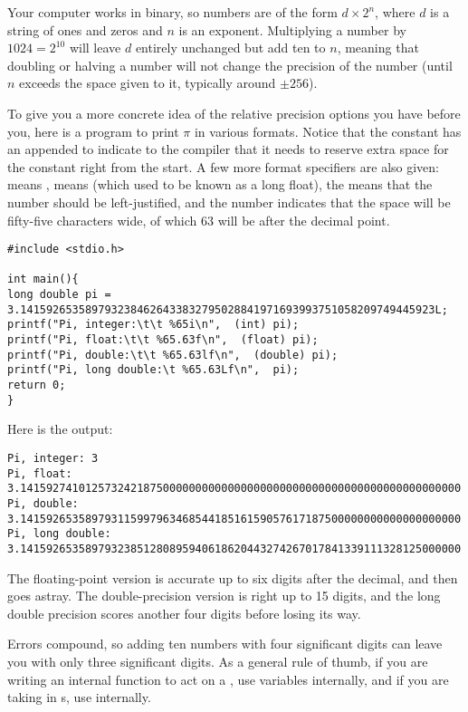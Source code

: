Your computer works in binary, so numbers are of the form $d \times
2^n$, where $d$ is a string of ones and zeros and $n$ is an exponent. 
Multiplying a number by $1024=2^{10}$ will leave $d$ entirely unchanged but
add ten to $n$, meaning that doubling or halving a number will not
change the precision of the number (until $n$ exceeds the space given to
it, typically around $\pm 256$).

To give you a more concrete idea of the relative precision options
you have before you, here is a program to print $\pi$ in various
formats. Notice that the constant has an  appended to indicate
to the compiler that it needs to reserve extra space for the constant
right from the start. \label{printftwo} A few more  format
specifiers are also given:  means ,  means
 (which used to be known as a long float), the \ci{-} means
that the number should be left-justified, and the number 
indicates that the space will be fifty-five characters wide, of which
63 will be after the decimal point.

\begin{lstlisting}
#include <stdio.h>

int main(){
long double pi = 3.1415926535897932384626433832795028841971693993751058209749445923L;
printf("Pi, integer:\t\t %65i\n",  (int) pi);
printf("Pi, float:\t\t %65.63f\n",  (float) pi);
printf("Pi, double:\t\t %65.63lf\n",  (double) pi);
printf("Pi, long double:\t %65.63Lf\n",  pi);
return 0;
}
\end{lstlisting}

Here is the output:
\begin{lstlisting}[language={}]
Pi, integer: 3
Pi, float:  3.14159274101257324218750000000000000000000000000000000000000000000000
Pi, double:      3.14159265358979311599796346854418516159057617187500000000000000000000
Pi, long double: 3.14159265358979323851280895940618620443274267017841339111328125000000
\end{lstlisting}
The floating-point version is accurate up to six digits after the
decimal, and then goes astray. The double-precision version is right up to 15
digits, and the long double precision scores another four digits before
losing its way.

Errors compound, so adding ten numbers
with four significant digits can leave you with only three significant
digits. As a general rule of thumb, if you are writing an internal
function to act on a , use  variables internally,
and if you are taking in s, use  internally.

